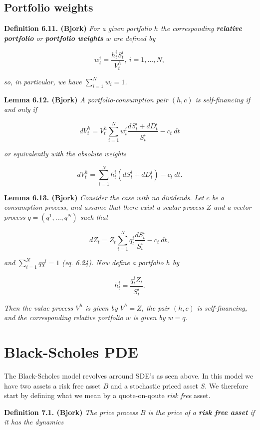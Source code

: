 \documentclass[a4paper,10pt,openany]{book}
\begin{document}
\hypertarget{portfolio-weights}{%
\subsection{Portfolio weights}\label{portfolio-weights}}

\textbf{Definition 6.11. (Bjork)} \emph{For a given portfolio \(h\) the corresponding \textbf{relative portfolio} or \textbf{portfolio weights} \(w\) are defined by}

\[
w_t^i=\frac{h_t^iS_t^i}{V_t^h},\ i=1,...,N,\tag{6.21}
\]

\emph{so, in particular, we have \(\sum_{i=1}^N w_i=1\).}

\textbf{Lemma 6.12. (Bjork)} \emph{A portfolio-consumption pair \((h,c)\) is self-financing if and only if}

\[
dV_t^h=V_t^h\sum_{i=1}^N w_t^i\frac{dS_t^i+dD_t^i}{S_t^i}-c_t\ dt\tag{6.22}
\]

\emph{or equivalently with the absolute weights}

\[
dV_t^h=\sum_{i=1}^N h_t^i(dS_t^i+dD_t^i)-c_t\ dt.
\]

\textbf{Lemma 6.13. (Bjork)} \emph{Consider the case with no dividends. Let \(c\) be a consumption process, and assume that there exist a scalar process \(Z\) and a vector process \(q=(q^1,...,q^N)\) such that}

\[
dZ_t=Z_t\sum_{i=1}^N q_t^i\frac{dS_t^i}{S_t^i}-c_t\ dt,\tag{6.23}
\]

\emph{and \(\sum_{i=1}^Nqq^i=1\) (eq. 6.24). Now define a portfolio \(h\) by}

\[
h_t^i=\frac{q_t^iZ_t}{S_t^i}.\tag{6.25}
\]

\emph{Then the value process \(V^h\) is given by \(V^h=Z\), the pair \((h,c)\) is self-financing, and the corresponding relative portfolio \(w\) is given by \(w=q\).}

\hypertarget{black-scholes-pde}{%
\section{Black-Scholes PDE}\label{black-scholes-pde}}

The Black-Scholes model revolves arround SDE's as seen above. In this model we have two assets a risk free asset \(B\) and a stochastic priced asset \(S\). We therefore start by defining what we mean by a quote-on-qoute \emph{risk free} asset.

\textbf{Definition 7.1. (Bjork)} \emph{The price process \(B\) is the price of a \textbf{risk free asset} if it has the dynamics}
\end{document}
